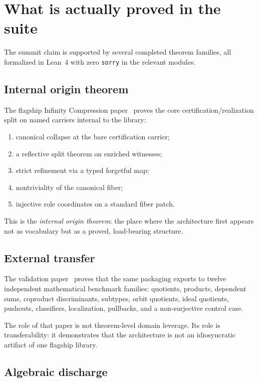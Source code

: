 \documentclass[11pt]{article}
\begin{document}
\section{What is actually proved in the suite}\label{sec:proved-suite}

The summit claim is supported by several completed theorem families, all formalized
in Lean~4 with zero \texttt{sorry} in the relevant modules.

\subsection{Internal origin theorem}

The flagship Infinity Compression paper~\cite{SpivackIC} proves the core
certification/realization split on named carriers internal to the library:

\begin{enumerate}[label=(\arabic*)]
  \item canonical collapse at the bare certification carrier;
  \item a reflective split theorem on enriched witnesses;
  \item strict refinement via a typed forgetful map;
  \item nontriviality of the canonical fiber;
  \item injective role coordinates on a standard fiber patch.
\end{enumerate}

This is the \emph{internal origin theorem}: the place where the architecture first
appears not as vocabulary but as a proved, load-bearing structure.

\subsection{External transfer}

The validation paper~\cite{SpivackValidation} proves that the same packaging
exports to twelve independent mathematical benchmark families: quotients,
products, dependent sums, coproduct discriminants, subtypes, orbit quotients,
ideal quotients, pushouts, classifiers, localization, pullbacks, and a
non-surjective control case.

The role of that paper is not theorem-level domain leverage. Its role is
transferability: it demonstrates that the architecture is not an idiosyncratic
artifact of one flagship library.

\subsection{Algebraic discharge}
\end{document}

